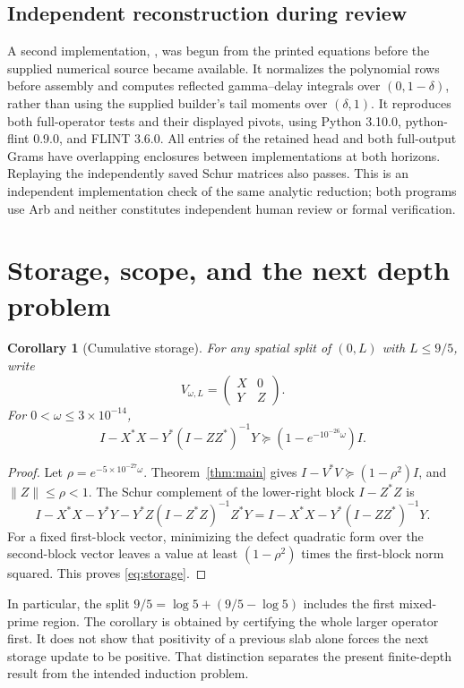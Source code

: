 \documentclass[11pt]{article}
\numberwithin{equation}{section}
\newtheorem{corollary}[theorem]{Corollary}
\theoremstyle{definition}
\theoremstyle{remark}
\newcommand{\norm}[1]{\lVert#1\rVert}
\begin{document}
\subsection{Independent reconstruction during review}

A second implementation, , was begun from the
printed equations before the supplied numerical source became available.
It normalizes the polynomial rows before assembly and computes reflected
gamma--delay integrals over $(0,1-\delta)$, rather than using the supplied
builder's tail moments over $(\delta,1)$. It reproduces both full-operator
tests and their displayed pivots, using Python 3.10.0, python-flint 0.9.0,
and FLINT 3.6.0. All entries of the retained head and both full-output Grams
have overlapping enclosures between implementations at both horizons.
Replaying the independently saved Schur matrices also passes.
This is an independent implementation check of the same analytic reduction;
both programs use Arb and neither constitutes independent human review or
formal verification.

\section{Storage, scope, and the next depth problem}\label{sec:storage}

\begin{corollary}[Cumulative storage]\label{cor:storage}
For any spatial split of $(0,L)$ with $L\le9/5$, write
\[
 V_{\omega,L}=\begin{pmatrix}X&0\\Y&Z\end{pmatrix}.
\]
For $0<\omega\le3\times10^{-14}$,
\begin{equation}\label{eq:storage}
 I-X^*X-Y^*(I-ZZ^*)^{-1}Y
 \succeq(1-e^{-10^{-26}\omega})I.
\end{equation}
\end{corollary}
\begin{proof}
Let $\rho=e^{-5\times10^{-27}\omega}$. Theorem~\ref{thm:main} gives
$I-V^*V\succeq(1-\rho^2)I$, and $\norm Z\le\rho<1$.
The Schur complement of the lower-right block $I-Z^*Z$ is
\[
 I-X^*X-Y^*Y-Y^*Z(I-Z^*Z)^{-1}Z^*Y
 =I-X^*X-Y^*(I-ZZ^*)^{-1}Y.
\]
For a fixed first-block vector, minimizing the defect quadratic form over
the second-block vector leaves a value at least
$(1-\rho^2)$ times the first-block norm squared. This proves
\eqref{eq:storage}.
\end{proof}

In particular, the split $9/5=\log5+(9/5-\log5)$ includes the first
mixed-prime region. The corollary is obtained by certifying the whole larger
operator first. It does not show that positivity of a previous slab alone
forces the next storage update to be positive. That distinction separates
the present finite-depth result from the intended induction problem.
\end{document}
